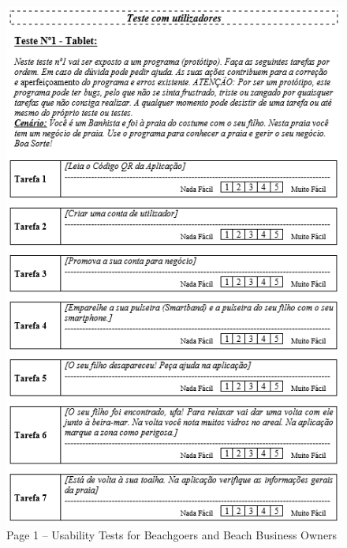 \begin{figure}[H]
  \centering
  \includegraphics[width=14cm]{figs/UsabilityTest_Beachgoers_1.png}
  \caption{Page 1 – Usability Tests for Beachgoers and Beach Business Owners}
  \label{fig:UsabilityTest_Beachgoers_1}
\end{figure}
